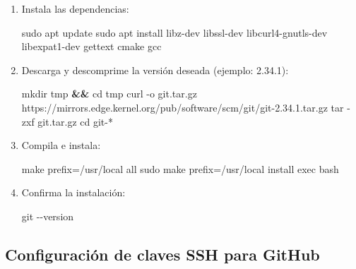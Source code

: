 \documentclass[
  doc,
  floatsintext,
  longtable,
  a4paper,
  nolmodern,
  notxfonts,
  notimes,
  colorlinks=true,linkcolor=blue,citecolor=blue,urlcolor=blue]{apa7}
\newenvironment{Shaded}{\begin{snugshade}}{\end{snugshade}}
\newcommand{\AttributeTok}[1]{\textcolor[rgb]{0.40,0.45,0.13}{#1}}
\newcommand{\BuiltInTok}[1]{\textcolor[rgb]{0.00,0.23,0.31}{#1}}
\newcommand{\ExtensionTok}[1]{\textcolor[rgb]{0.00,0.23,0.31}{#1}}
\newcommand{\FunctionTok}[1]{\textcolor[rgb]{0.28,0.35,0.67}{#1}}
\newcommand{\KeywordTok}[1]{\textcolor[rgb]{0.00,0.23,0.31}{\textbf{#1}}}
\newcommand{\NormalTok}[1]{\textcolor[rgb]{0.00,0.23,0.31}{#1}}
\newcommand{\PreprocessorTok}[1]{\textcolor[rgb]{0.68,0.00,0.00}{#1}}
\begin{document}
\begin{enumerate}
\def\labelenumi{\arabic{enumi}.}
\item
  Instala las dependencias:

\begin{Shaded}
\begin{Highlighting}[]
\FunctionTok{sudo}\NormalTok{ apt update}
\FunctionTok{sudo}\NormalTok{ apt install libz{-}dev libssl{-}dev libcurl4{-}gnutls{-}dev libexpat1{-}dev gettext cmake gcc}
\end{Highlighting}
\end{Shaded}
\item
  Descarga y descomprime la versión deseada (ejemplo: 2.34.1):

\begin{Shaded}
\begin{Highlighting}[]
\FunctionTok{mkdir}\NormalTok{ tmp }\KeywordTok{\&\&} \BuiltInTok{cd}\NormalTok{ tmp}
\ExtensionTok{curl} \AttributeTok{{-}o}\NormalTok{ git.tar.gz https://mirrors.edge.kernel.org/pub/software/scm/git/git{-}2.34.1.tar.gz}
\FunctionTok{tar} \AttributeTok{{-}zxf}\NormalTok{ git.tar.gz}
\BuiltInTok{cd}\NormalTok{ git{-}}\PreprocessorTok{*}
\end{Highlighting}
\end{Shaded}
\item
  Compila e instala:

\begin{Shaded}
\begin{Highlighting}[]
\FunctionTok{make}\NormalTok{ prefix=/usr/local all}
\FunctionTok{sudo}\NormalTok{ make prefix=/usr/local install}
\BuiltInTok{exec}\NormalTok{ bash}
\end{Highlighting}
\end{Shaded}
\item
  Confirma la instalación:

\begin{Shaded}
\begin{Highlighting}[]
\FunctionTok{git} \AttributeTok{{-}{-}version}
\end{Highlighting}
\end{Shaded}
\end{enumerate}

\subsection{Configuración de claves SSH para
GitHub}\label{configuraciuxf3n-de-claves-ssh-para-github}
\end{document}
